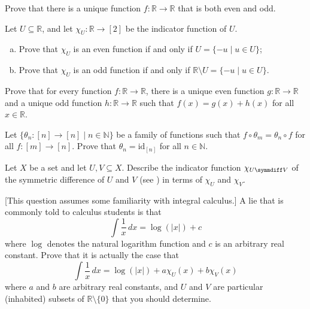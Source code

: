 \begin{chapex}
Prove that there is a unique function $f : \mathbb{R} \to \mathbb{R}$ that is both even and odd.
\end{chapex}

\begin{chapex}
Let $U \subseteq \mathbb{R}$, and let $\chi_U : \mathbb{R} \to [2]$ be the indicator function of $U$.
\begin{enumerate}[(a)]
\item Prove that $\chi_U$ is an even function if and only if $U = \{ -u \mid u \in U \}$;
\item Prove that $\chi_U$ is an odd function if and only if $\mathbb{R} \setminus U = \{ -u \mid u \in U \}$.
\end{enumerate}
\end{chapex}

\begin{chapex}
\label{cqEveryFunctionIsUniquelySumOfEvenAndOdd}
Prove that for every function $f : \mathbb{R} \to \mathbb{R}$, there is a unique even function $g : \mathbb{R} \to \mathbb{R}$ and a unique odd function $h : \mathbb{R} \to \mathbb{R}$ such that $f(x)=g(x)+h(x)$ for all $x \in \mathbb{R}$.
\end{chapex}

\begin{chapex}
\label{cqNaturalTransformationFromIdToId}
Let $\{ \theta_n : [n] \to [n] \mid n \in \mathbb{N} \}$ be a family of functions such that $f \circ \theta_m = \theta_n \circ f$ for all $f : [m] \to [n]$. Prove that $\theta_n = \mathrm{id}_{[n]}$ for all $n \in \mathbb{N}$.
\end{chapex}

\begin{chapex}
Let $X$ be a set and let $U, V \subseteq X$. Describe the indicator function $\chi_{U \symmdiff V}$ of the symmetric difference of $U$ and $V$ (see ) in terms of $\chi_U$ and $\chi_V$.
\end{chapex}

\begin{chapex}
\label{cqAntiderivativeOfLogarithm}
[This question assumes some familiarity with 
integral calculus.] A lie that is commonly told to calculus students is that
\[ \int \dfrac{1}{x} \, dx = \log(|x|) + c \]
where $\log$ denotes the natural logarithm function and $c$ is an arbitrary real constant. Prove that it is actually the case that
\[ \int \dfrac{1}{x} \, dx = \log(|x|) + a \chi_U(x) + b \chi_V(x) \]
where $a$ and $b$ are arbitrary real constants, and $U$ and $V$ are particular (inhabited) subsets of $\mathbb{R} \setminus \{ 0 \}$ that you should determine.
\end{chapex}

